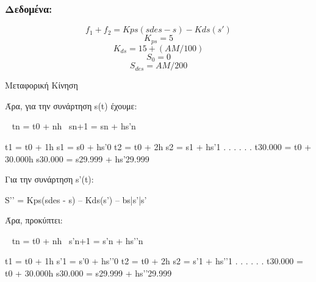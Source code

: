 \documentclass[a4paper]{article}
\begin{document}
        \subsubsection{Δεδομένα:}
        \begin{equation}
            f_1 + f_2 = Kps (sdes - s) - Kds (s')
        \end{equation}
        \begin{equation}
            K_{ps} = 5
        \end{equation}
        \begin{equation}
            K_{ds} = 15 + (AM/ 100)
        \end{equation}
        \begin{equation}
            S_0 =0
        \end{equation}
        \begin{equation}
            S_{des} = AM / 200
        \end{equation}
            
        

        Μεταφορική Κίνηση


        Άρα, για την συνάρτηση s(t) έχουμε:

        ~ tn = t0 + nh					~sn+1 = sn  + hs’n

        t1 = t0  + 1h					   s1    = s0  + hs’­­­0
        t2 = t0  + 2h					   s2    = s1  + hs’1
            .						     .
            .						     .
            .						     .
        t30.000 = t0 + 30.000h			    s30.000 = s29.999 + hs’29.999
            
        Για την συνάρτηση s’(t):

            S’’	= Kps(sdes - s) – Kds(s’) – bs|s’|s’

            Άρα, προκύπτει:

        ~ tn = t0 + nh					~s’n+1 = s’n  + hs’’n

        t1 = t0  + 1h					   s’1    = s’0  + hs’’­­­0
        t2 = t0  + 2h					   s2    = s’1  + hs’’1
            .						     .
            .						     .
            .						     .
        t30.000 = t0 + 30.000h			   s30.000 = s29.999 + hs’’29.999
\end{document}
